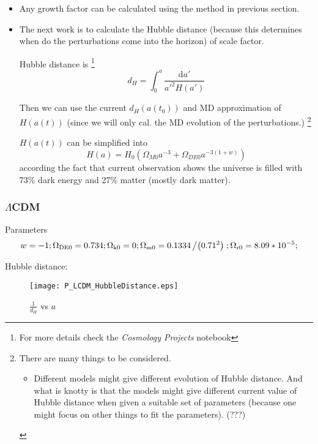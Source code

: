 \documentclass{article}
\begin{document}
\begin{itemize}
\item
Any growth factor can be calculated using the method in previous section.

\item
The next work is to calculate the Hubble distance (because this determines when do the perturbations come into the horizon) of scale factor.

Hubble distance is 
\footnote{
For more details check the {\it Cosmology Projects} notebook}
\begin{equation}
d_H=\int^{a}_{0}{ \frac{\mathrm d a'}{a'^2H(a')} }
\end{equation}

Then we can use the current $d_H(a(t_0))$ and MD approximation of $H(a(t))$ (since we will only cal. the MD evolution of the perturbations.) 
\footnote{
There are many things to be considered. 
\begin{itemize}
\item 
Different models might give different evolution of Hubble distance. And what is knotty is that the models might give different current value of Hubble distance when given a suitable set of parameters (because one might focus on other things to fit the parameters). (???) 

\end{itemize}}

$H(a(t))$ can be simplified into 
\begin{equation}
H(a)=H_0 (\Omega_{M0}a^{-3}+\Omega_{DE0}a^{-3(1+w)})
\end{equation}
according the fact that current observation shows the universe is filled with 73\% dark energy and 27\% matter (mostly dark matter).

\end{itemize}


\subsubsection{$\Lambda$CDM}

Parameters
\begin{eqnarray*}
w=-1;\Omega _{\text{DE0}}=0.734;\Omega _{\text{k0}}=0;\Omega _{\text{m0}}=0.1334\left/\left(0.71^2\right)\right.;\Omega _{\text{r0}}=8.09*10^{-5};
\end{eqnarray*}

Hubble distance:
\begin{figure}[!htbp]
\centering
\texttt{[image: P\_LCDM\_HubbleDistance.eps]}
\caption{$\frac{1}{d_H}$ vs $a$}
\end{figure}
\end{document}
